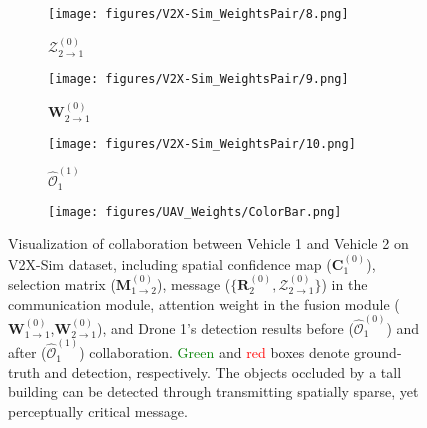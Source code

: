\documentclass{article}
\begin{document}
\begin{figure}[!t]
\begin{subfigure}{0.18\linewidth}
    \label{fig:UAV_RequestMap2}
  \end{subfigure}
  \begin{subfigure}{0.18\linewidth}
    \texttt{[image: figures/V2X-Sim\_WeightsPair/8.png]}
    \vspace{-5mm}
    \caption{$\mathcal{Z}_{2\rightarrow 1}^{(0)}$}
    \label{fig:UAV_Message2}
  \end{subfigure}
  \begin{subfigure}{0.18\linewidth}
    \texttt{[image: figures/V2X-Sim\_WeightsPair/9.png]}
    \vspace{-5mm}
    \caption{$\mathbf{W}_{2\rightarrow 1}^{(0)}$}
    \label{fig:UAV_AttenWeight2to1}
  \end{subfigure}
\begin{subfigure}{0.18\linewidth}
    \texttt{[image: figures/V2X-Sim\_WeightsPair/10.png]}
    \vspace{-5mm}
    \caption{$\widehat{\mathcal{O}}_{1}^{(1)}$}
    \label{fig:UAV_DetectionAfterComm}
  \end{subfigure}
  \begin{subfigure}{0.06\linewidth}
    \texttt{[image: figures/UAV\_Weights/ColorBar.png]}
\end{subfigure}
\vspace{-2mm}
  \caption{Visualization of collaboration between Vehicle 1 and Vehicle 2 on V2X-Sim dataset, including spatial confidence map ($\mathbf{C}_1^{(0)}$), selection matrix ($\mathbf{M}_{1\rightarrow2}^{(0)}$), message ($\{\mathbf{R}_2^{(0)},\mathcal{Z}_{2\rightarrow1}^{(0)}\}$) in the communication module, attention weight in the fusion module ($\mathbf{W}_{1\rightarrow1}^{(0)}$,$\mathbf{W}_{2\rightarrow1}^{(0)}$), and Drone 1's detection results before ($\widehat{\mathcal{O}}_{1}^{(0)}$) and after ($\widehat{\mathcal{O}}_{1}^{(1)}$) collaboration. \textcolor{green}{Green} and \textcolor{red}{red} boxes denote ground-truth and detection, respectively. The objects occluded by a tall building can be detected through transmitting spatially sparse, yet perceptually critical message. }
  \label{fig:V2X-Sim_Weights}
  \vspace{-4mm}
\end{figure}
\end{document}
